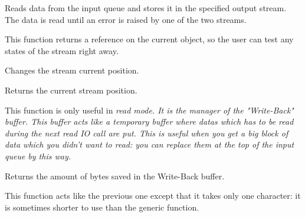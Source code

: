 
Reads data from the input queue and stores it in the specified output stream.
The data is read until an error is raised by one of the two streams.


This function returns a reference on the current object, so the user can test
any states of the stream right away.



Changes the stream current position.



Returns the current stream position.

\label{wxinputstream_ungetch}


This function is only useful in \it{read} mode. It is the manager of the "Write-Back"
buffer. This buffer acts like a temporary buffer where datas which has to be
read during the next read IO call are put. This is useful when you get a big
block of data which you didn't want to read: you can replace them at the top
of the input queue by this way.


Returns the amount of bytes saved in the Write-Back buffer.


This function acts like the previous one except that it takes only one
character: it is sometimes shorter to use than the generic function.

